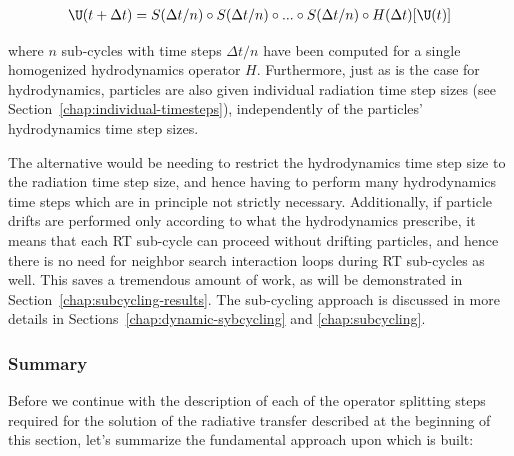\begin{align}
    \U(t + \Delta t) =
        S(\Delta t/n) \circ S(\Delta t/n) \circ ... \circ S(\Delta t/n) \circ H(\Delta t)[\U(t)]
\end{align}

where $n$ sub-cycles with time steps $\Delta t/n$ have been computed for a single homogenized
hydrodynamics operator $H$. Furthermore, just as is the case for hydrodynamics, particles are also
given individual radiation time step sizes (see Section~\ref{chap:individual-timesteps}),
independently of the particles' hydrodynamics time step sizes.

The alternative would be needing to restrict the hydrodynamics time step size to the radiation time
step size, and hence having to perform many hydrodynamics time steps which are in principle not
strictly necessary. Additionally, if particle drifts are performed only according to what the
hydrodynamics prescribe, it means that each RT sub-cycle can proceed without drifting particles, and
hence there is no need for neighbor search interaction loops during RT sub-cycles as well. This
saves a tremendous amount of work, as will be demonstrated in Section~\ref{chap:subcycling-results}. The
sub-cycling approach is discussed in more details in Sections~\ref{chap:dynamic-sybcycling} and \ref{chap:subcycling}.







\subsubsection{Summary}

Before we continue with the description of each of the operator splitting steps required
for the solution of the radiative transfer described at the beginning of this section, let's
summarize the fundamental approach upon which \GEARRT is built:

